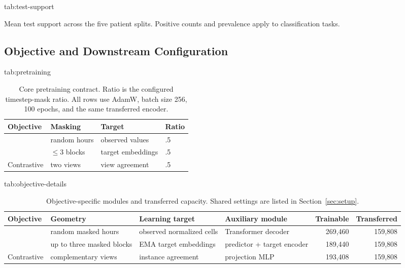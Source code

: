 \begin{table}[htbp]
\floatconts
  {tab:test-support}
  {\caption{Mean test support across the five patient splits. Positive counts and prevalence apply to classification tasks.}}
  {\scriptsize
  }
\end{table}

\subsection{Objective and Downstream Configuration}
\label{app:config}

\begin{table}[!htbp]
\floatconts
  {tab:pretraining}
  {\caption{Core pretraining contract. Ratio is the configured timestep-mask ratio. All rows use AdamW, batch size 256, 100 epochs, and the same transferred encoder.}}
  {\scriptsize
  \begin{tabular}{llll}
  \toprule
  Objective & Masking & Target & Ratio \\
  \midrule
  \MAE{} & random hours & observed values & .5 \\
  \JEPA{} & $\leq3$ blocks & target embeddings & .5 \\
  Contrastive & two views & view agreement & .5 \\
  \bottomrule
  \end{tabular}}
\end{table}

\begin{table}[htbp]
\floatconts
  {tab:objective-details}
  {\caption{Objective-specific modules and transferred capacity. Shared settings are listed in Section~\ref{sec:setup}.}}
  {\scriptsize
  \begin{tabular}{llllrr}
  \toprule
  Objective & Geometry & Learning target & Auxiliary module & Trainable & Transferred \\
  \midrule
  \MAE{} & random masked hours & observed normalized cells & Transformer decoder & 269,460 & 159,808 \\
  \JEPA{} & up to three masked blocks & EMA target embeddings & predictor + target encoder & 189,440 & 159,808 \\
  Contrastive & complementary views & instance agreement & projection MLP & 193,408 & 159,808 \\
  \bottomrule
  \end{tabular}}
\end{table}

